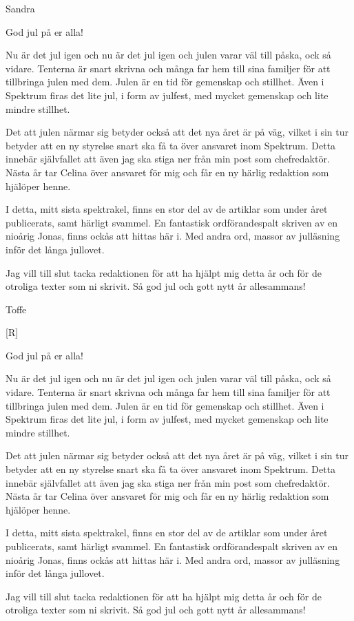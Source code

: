 \documentclass[pagecheck]{spektraklet}
\begin{document}
\begin{ledaren}{Sandra}


God jul på er alla!

Nu är det jul igen och nu är det jul igen och julen varar väl till påska, ock så vidare. Tenterna är snart skrivna och många far hem till sina familjer för att tillbringa julen med dem. Julen är en tid för gemenskap och stillhet. Även i Spektrum firas det lite jul, i form av julfest, med mycket gemenskap och lite mindre stillhet.

Det att julen närmar sig betyder också att det nya året är på väg, vilket i sin tur betyder att en ny styrelse snart ska få ta över ansvaret inom Spektrum. Detta innebär självfallet att även jag ska stiga ner från min post som chefredaktör. Nästa år tar Celina över ansvaret för mig och får en ny härlig redaktion som hjälöper henne.

I detta, mitt sista spektrakel, finns en stor del av de artiklar som under året publicerats, samt härligt svammel. En fantastisk ordförandespalt skriven av en nioårig Jonas, finns ockås att hittas här i. Med andra ord, massor av julläsning inför det långa jullovet.

Jag vill till slut tacka redaktionen för att ha hjälpt mig detta år och för de otroliga texter som ni skrivit. Så god jul och gott nytt år allesammans!

\end{ledaren}




\begin{ordforandespalten}{Toffe}

[R]

God jul på er alla!

Nu är det jul igen och nu är det jul igen och julen varar väl till påska, ock så vidare. Tenterna är snart skrivna och många far hem till sina familjer för att tillbringa julen med dem. Julen är en tid för gemenskap och stillhet. Även i Spektrum firas det lite jul, i form av julfest, med mycket gemenskap och lite mindre stillhet.

Det att julen närmar sig betyder också att det nya året är på väg, vilket i sin tur betyder att en ny styrelse snart ska få ta över ansvaret inom Spektrum. Detta innebär självfallet att även jag ska stiga ner från min post som chefredaktör. Nästa år tar Celina över ansvaret för mig och får en ny härlig redaktion som hjälöper henne.

I detta, mitt sista spektrakel, finns en stor del av de artiklar som under året publicerats, samt härligt svammel. En fantastisk ordförandespalt skriven av en nioårig Jonas, finns ockås att hittas här i. Med andra ord, massor av julläsning inför det långa jullovet.

Jag vill till slut tacka redaktionen för att ha hjälpt mig detta år och för de otroliga texter som ni skrivit. Så god jul och gott nytt år allesammans!
	
\end{ordforandespalten}
\end{document}
